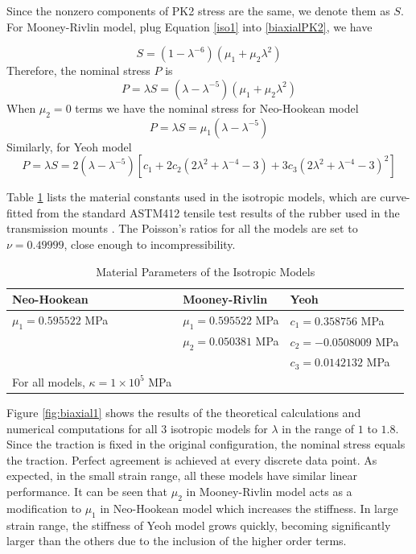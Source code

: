 Since the nonzero components of PK2 stress are the same, we denote them as $S$. For Mooney-Rivlin model, plug Equation \ref{iso1} into \ref{biaxialPK2}, we have

\begin{equation}
S = (1 - {\lambda}^{-6})(\mu_1 + \mu_2{\lambda}^2)
\end{equation}
Therefore, the nominal stress $P$ is
\begin{equation}
P = \lambda S =  (\lambda - {\lambda}^{-5})(\mu_1 + \mu_2{\lambda}^2)
\end{equation}
When $\mu_2 = 0$ terms we have the nominal stress for Neo-Hookean model
\begin{equation}
P = \lambda S =  \mu_1(\lambda - {\lambda}^{-5})
\end{equation}
Similarly, for Yeoh model
\begin{equation}
P = \lambda S = 2(\lambda - {\lambda}^{-5})\left[c_1 + 2c_2(2{\lambda}^2 + {\lambda}^{-4} - 3) + 3c_3(2{\lambda}^2 + {\lambda}^{-4} - 3)^2\right]
\end{equation}



Table \ref{parameters} lists the material constants used in the isotropic models, which are curve-fitted from the standard ASTM412 tensile test results of the rubber used in the transmission mounts \cite{Sharma}. The Poisson's ratios for all the models are set to $\nu = 0.49999$, close enough to incompressibility.

\begin{table}[H]
\centering
\caption{Material Parameters of the Isotropic Models}
\begin{tabular} { l  l  l }
	\hline
	Neo-Hookean & Mooney-Rivlin & Yeoh \\
	\hline
	$\mu_1 = 0.595522$ MPa & $\mu_1 = 0.595522$ MPa & $c_1 = 0.358756$ MPa \\
	& $\mu_2 = 0.050381$ MPa & $c_2 = - 0.0508009$ MPa \\
	& & $c_3 = 0.0142132$ MPa \\
	\hline
	For all models, $\kappa = 1 \times 10^5 $ MPa \\
	\hline
\end{tabular}
\label{parameters}
\end{table}

Figure \ref{fig:biaxial1} shows the results of the theoretical calculations and numerical computations for all $3$ isotropic models for $\lambda$ in the range of $1$ to $1.8$. Since the traction is fixed in the original configuration, the nominal stress equals the traction. Perfect agreement is achieved at every discrete data point. As expected, in the small strain range, all these models have similar linear performance. It can be seen that $\mu_2$ in Mooney-Rivlin model acts as a modification to $\mu_1$ in Neo-Hookean model which increases the stiffness. In large strain range, the stiffness of Yeoh model grows quickly, becoming significantly larger than the others due to the inclusion of the higher order terms.



